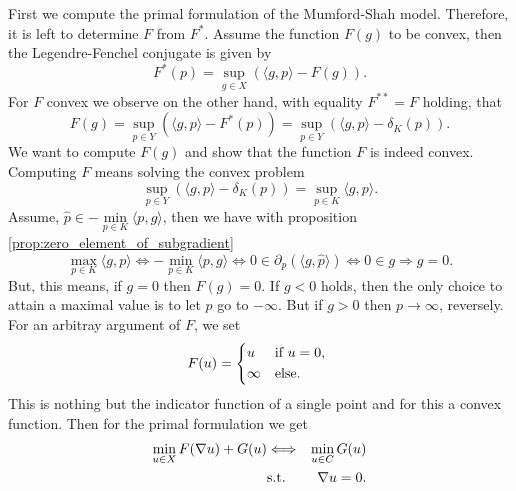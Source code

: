 \documentclass{scrreprt}
\begin{document}
        First we compute the primal formulation of the Mumford-Shah model. Therefore, it is left to determine $F$ from $F^{\ast}$. Assume the function $F(g)$ to be convex, then the Legendre-Fenchel conjugate is given by
            $$
                F^{\ast}(p) = \sup_{g \in X} \left( \langle g, p \rangle - F(g) \right).
            $$
        For $F$ convex we observe on the other hand, with equality $F^{\ast\ast} = F$ holding, that
            $$
                F(g) = \sup_{p \in Y} \left( \langle g, p \rangle - F^{\ast}(p) \right) = \sup_{p \in Y} \left( \langle g, p \rangle - \delta_{K}(p) \right).
            $$
        We want to compute $F(g)$ and show that the function $F$ is indeed convex. Computing $F$ means solving the convex problem
            $$
                \sup_{p \in Y} \left( \langle g, p \rangle - \delta_{K}(p) \right) = \sup_{p \in K} \langle g, p \rangle.
            $$
        Assume, $\hat{p} \in -\min\limits_{p \in K} \langle p, g \rangle$, then we have with proposition \ref{prop:zero_element_of_subgradient}
            $$
                \max_{p \in K} \langle g, p \rangle \Longleftrightarrow -\min\limits_{p \in K} \langle p, g \rangle \Longleftrightarrow 0 \in \partial_{p} \left( \langle g, \hat{p} \rangle \right) \Longleftrightarrow 0 \in g \Longrightarrow g = 0.
            $$
        But, this means, if $g = 0$ then $F(g) = 0$. If $g < 0$ holds, then the only choice to attain a maximal value is to let $p$ go to $- \infty$. But if $g > 0$ then $p \to \infty$, reversely. For an arbitray argument of $F$, we set
            $$
                F(u) =
                    \begin{dcases*}
                        u & \textnormal{if $u = 0$,} \\
                        \infty & \textnormal{else.}
                    \end{dcases*}
            $$
        This is nothing but the indicator function of a single point and for this a convex function. Then for the primal formulation we get
            \begin{eqnarray}
                \min_{u \in X} F(\nabla u) + G(u) &\Longleftrightarrow& \min_{u \in C} G(u) \notag \\
                &\textnormal{s.t.}& \,\,\, \nabla u = 0. \notag
            \end{eqnarray}
\end{document}
